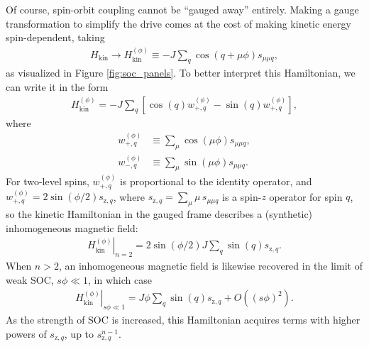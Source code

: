 \documentclass[nofootinbib,twocolumn]{revtex4-2}
\renewcommand{\t}{\text} %
\newcommand{\p}[1]{\left(#1\right)} %
\renewcommand{\sp}[1]{\left[#1\right]} %
\newcommand{\1}{\mathds{1}}
\newcommand{\z}{\text{z}}
\begin{document}
Of course, spin-orbit coupling cannot be ``gauged away'' entirely.
Making a gauge transformation to simplify the drive comes at the cost of making kinetic energy spin-dependent, taking
\begin{align}
  H_{\t{kin}} \to H_{\t{kin}}^{(\phi)}
  \equiv -J \sum_q \cos\p{q+\mu\phi} s_{\mu\mu q},
\end{align}
as visualized in Figure \ref{fig:soc_panels}.
To better interpret this Hamiltonian, we can write it in the form
\begin{align}
  H_{\t{kin}}^{(\phi)}
  = -J \sum_q
  \sp{\cos\p{q} w_{+,q}^{(\phi)} - \sin\p{q} w_{+,q}^{(\phi)}},
\end{align}
where
\begin{align}
  w_{+,q}^{(\phi)} &\equiv \sum_\mu \cos\p{\mu\phi} s_{\mu\mu q}, \\
  w_{-,q}^{(\phi)} &\equiv \sum_\mu \sin\p{\mu\phi} s_{\mu\mu q}.
\end{align}
For two-level spins, $w_{+,q}^{(\phi)}$ is proportional to the identity operator, and $w_{+,q}^{(\phi)}=2\sin\p{\phi/2} s_{\z,q}$, where $s_{\z,q}=\sum_\mu \mu\, s_{\mu\mu q}$ is a spin-$z$ operator for spin $q$, so the kinetic Hamiltonian in the gauged frame describes a (synthetic) inhomogeneous magnetic field:
\begin{align}
  \left. H_{\t{kin}}^{(\phi)} \right|_{n=2}
  = 2\sin\p{\phi/2} J \sum_q \sin\p{q} s_{\z,q}.
\end{align}
When $n>2$, an inhomogeneous magnetic field is likewise recovered in the limit of weak SOC, $s\phi\ll1$, in which case
\begin{align}
  \left. H_{\t{kin}}^{(\phi)} \right|_{s\phi\ll1}
  = J\phi \sum_q \sin\p{q} s_{\z,q} + O\p{(s\phi)^2}.
\end{align}
As the strength of SOC is increased, this Hamiltonian acquires terms with higher powers of $s_{\z,q}$, up to $s_{\z,q}^{n-1}$.
\end{document}
